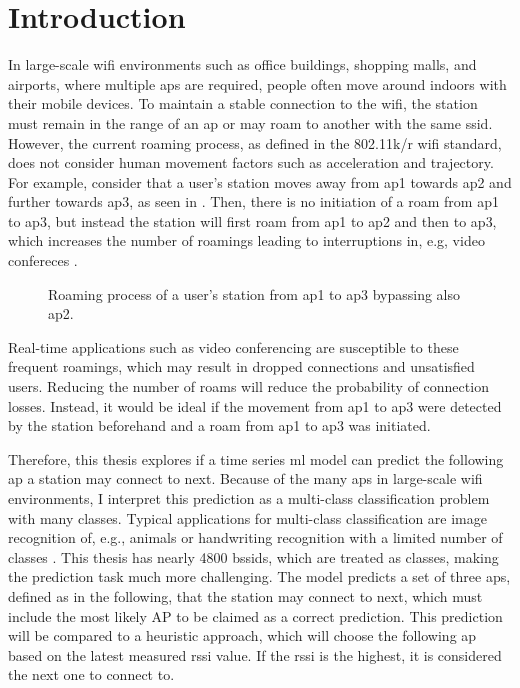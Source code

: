 \chapter{Introduction}\label{ch:intro}

In large-scale \ac{wifi} environments such as office buildings, shopping malls, and airports, where multiple \acp{ap} are required, people often move around indoors with their mobile devices.
To maintain a stable connection to the \ac{wifi}, the station must remain in the range of an \ac{ap} or may roam to another with the same \ac{ssid}.
However, the current roaming process, as defined in the 802.11k/r\cite{802.11k}\cite{802.11r} \ac{wifi} standard, does not consider human movement factors such as acceleration and trajectory.
For example, consider that a user's station moves away from \ac{ap}1 towards \ac{ap}2 and further towards \ac{ap}3, as seen in .
Then, there is no initiation of a roam from \ac{ap}1 to \ac{ap}3, but instead the station will first roam from \ac{ap}1 to \ac{ap}2 and then to \ac{ap}3, which increases the number of roamings leading to interruptions in, e.g, video confereces \cite{handoff_performance_issues}.

\begin{figure}[h]
    \centering
    
    \caption{Roaming process of a user's station from \ac{ap}1 to \ac{ap}3 bypassing also \ac{ap}2.}
    \label{fig:roaming}
\end{figure}

Real-time applications such as video conferencing are susceptible to these frequent roamings, which may result in dropped connections and unsatisfied users.
Reducing the number of roams will reduce the probability of connection losses.
Instead, it would be ideal if the movement from \ac{ap}1 to \ac{ap}3 were detected by the station beforehand and a roam from \ac{ap}1 to \ac{ap}3 was initiated.

Therefore, this thesis explores if a time series \ac{ml} model can predict the following \ac{ap} a station may connect to next.
Because of the many \acp{ap} in large-scale \ac{wifi} environments, I interpret this prediction as a multi-class classification problem with many classes.
Typical applications for multi-class classification are image recognition of, e.g., animals or handwriting recognition with a limited number of classes \cite{multi-class-classification}.
This thesis has nearly 4800 \acp{bssid}, which are treated as classes, making the prediction task much more challenging.
The model predicts a set of three \acp{ap}, defined as \threeAP in the following, that the station may connect to next, which must include the most likely AP to be claimed as a correct prediction.
This prediction will be compared to a heuristic approach, which will choose the following \ac{ap} based on the latest measured \ac{rssi} value.
If the \ac{rssi} is the highest, it is considered the next one to connect to.

